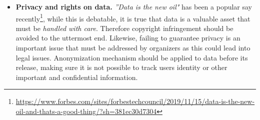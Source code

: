 \documentclass[twoside,11pt]{article}
\begin{document}
\begin{itemize}
    \item \textbf{Privacy and rights on data.} \emph{''Data is the new oil"} has been a popular say recently\footnote{\url{https://www.forbes.com/sites/forbestechcouncil/2019/11/15/data-is-the-new-oil-and-thats-a-good-thing/?sh=381ec30d7304}}, while this is debatable, it is true that data is a valuable asset that must be \emph{handled with care}. Therefore copyright infringement should be avoided to the uttermost end. Likewise, failing to guarantee  privacy is an important issue that must be addressed by organizers as this could lead into legal issues. Anonymization mechanism should be applied to data before its release, making sure it is not possible to track users identity or other important and confidential information.   %
    
\end{itemize}

\end{document}
